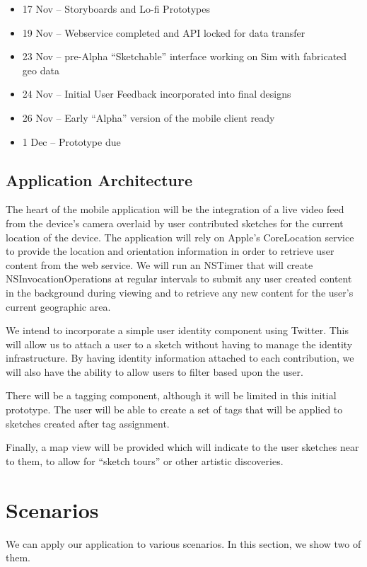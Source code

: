 \documentclass{article}
\begin{document}
\begin{itemize}
\item 17 Nov -- Storyboards and Lo-fi Prototypes
\item 19 Nov -- Webservice completed and API locked for data transfer
\item 23 Nov -- pre-Alpha ``Sketchable'' interface working on Sim with fabricated geo data
\item 24 Nov -- Initial User Feedback incorporated into final designs
\item 26 Nov -- Early ``Alpha'' version of the mobile client ready
\item 1 Dec -- Prototype due

\end{itemize}

\subsection{ Application Architecture }

The heart of the mobile application will be the integration of a live video
feed from the device's camera overlaid by user contributed sketches for the
current location of the device.  The application will rely on Apple's
CoreLocation service to provide the location and orientation information in
order to retrieve user content from the web service.  We will run an NSTimer
that will create NSInvocationOperations at regular intervals to submit any user
created content in the background during viewing and to retrieve any new
content for the user's current geographic area.

We intend to incorporate a simple user identity component using Twitter.  This
will allow us to attach a user to a sketch without having to manage the
identity infrastructure.  By having identity information attached to each
contribution, we will also have the ability to allow users to filter based upon
the user.

There will be a tagging component, although it will be limited in this initial
prototype.  The user will be able to create a set of tags that will be applied
to sketches created after tag assignment.

Finally, a map view will be provided which will indicate to the user sketches
near to them, to allow for ``sketch tours'' or other artistic discoveries.

\section{Scenarios}
We can apply our application to various scenarios. In this section, we show two
of them.
\end{document}
